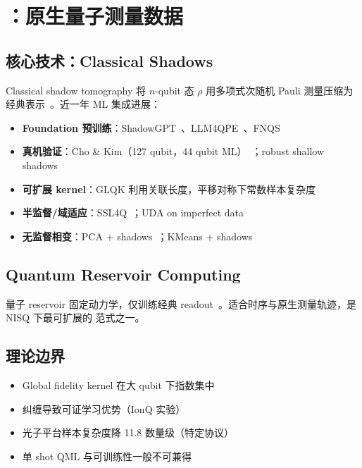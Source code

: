 \section{\pathtwo{}：原生量子测量数据}
\label{sec:path2}

\subsection{核心技术：Classical Shadows}

Classical shadow tomography 将 $n$-qubit 态 $\rho$ 用多项式次随机 Pauli 测量压缩为经典表示~\cite{Jerbi2024ShadowsQML}。近一年 ML 集成进展：

\begin{itemize}[leftmargin=*]
  \item \textbf{Foundation 预训练}：ShadowGPT~\cite{ShadowGPT2024}、LLM4QPE~\cite{LLM4QPE2024}、FNQS~\cite{FNQS2025}
  \item \textbf{真机验证}：Cho \& Kim（127 qubit，44 qubit ML）~\cite{Cho2024ExpMLQuantumData}；robust shallow shadows~\cite{RobustShallowShadows2025}
  \item \textbf{可扩展 kernel}：GLQK 利用关联长度，平移对称下常数样本复杂度~\cite{GLQK2025}
  \item \textbf{半监督/域适应}：SSL4Q~\cite{SSL4Q2024}；UDA on imperfect data~\cite{UDAImperfectQuantumData2026}
  \item \textbf{无监督相变}：PCA + shadows~\cite{UnsupPCAShadows2025}；KMeans + shadows~\cite{OrderedPhasesShadows2025}
\end{itemize}

\subsection{Quantum Reservoir Computing}

量子 reservoir 固定动力学，仅训练经典 readout~\cite{FeedbackQRC2024,MinimalisticQRC2025}。适合时序与原生测量轨迹，是 NISQ 下最可扩展的 \pathtwo{} 范式之一。

\subsection{理论边界}

\begin{itemize}[leftmargin=*]
  \item Global fidelity kernel 在大 qubit 下指数集中~\cite{ExponentialConcentrationQK2024}
  \item 纠缠导致可证学习优势（IonQ 实验）~\cite{EntanglementAdvantage2025}
  \item 光子平台样本复杂度降 11.8 数量级（特定协议）~\cite{PreskillPhotonicLearning2025}
  \item 单 shot QML 与可训练性一般不可兼得~\cite{SingleShotQMLLimits2025}
\end{itemize}
